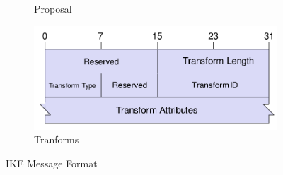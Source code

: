 \begin{figure}[h]
\begin{subfigure}{.4\textwidth}
    \caption{Proposal}\label{fig:proposal_structure}
  \end{subfigure}
  \hspace{.05\textwidth}
  \begin{subfigure}{.4\textwidth}
    \centering
    \includegraphics[width=\textwidth]{figures/ike_transform_structure.png}
    \caption{Tranforms}\label{fig:ike_transform_structure}
  \end{subfigure}
  \caption{IKE Message Format}\label{fig:ike_message_format}
\end{figure}
